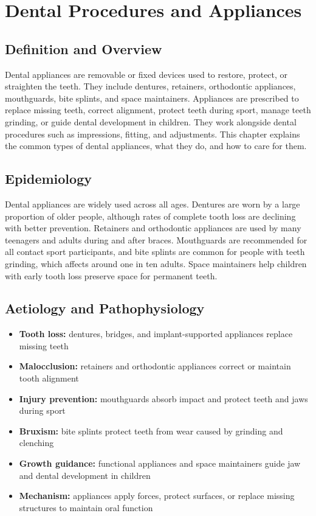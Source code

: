 \chapter{Dental Procedures and Appliances}

\section*{Definition and Overview}
Dental appliances are removable or fixed devices used to restore, protect, or straighten the teeth. They include dentures, retainers, orthodontic appliances, mouthguards, bite splints, and space maintainers. Appliances are prescribed to replace missing teeth, correct alignment, protect teeth during sport, manage teeth grinding, or guide dental development in children. They work alongside dental procedures such as impressions, fitting, and adjustments. This chapter explains the common types of dental appliances, what they do, and how to care for them.

\section*{Epidemiology}
Dental appliances are widely used across all ages. Dentures are worn by a large proportion of older people, although rates of complete tooth loss are declining with better prevention. Retainers and orthodontic appliances are used by many teenagers and adults during and after braces. Mouthguards are recommended for all contact sport participants, and bite splints are common for people with teeth grinding, which affects around one in ten adults. Space maintainers help children with early tooth loss preserve space for permanent teeth.

\section*{Aetiology and Pathophysiology}
\begin{itemize}
    \item \textbf{Tooth loss:} dentures, bridges, and implant-supported appliances replace missing teeth
    \item \textbf{Malocclusion:} retainers and orthodontic appliances correct or maintain tooth alignment
    \item \textbf{Injury prevention:} mouthguards absorb impact and protect teeth and jaws during sport
    \item \textbf{Bruxism:} bite splints protect teeth from wear caused by grinding and clenching
    \item \textbf{Growth guidance:} functional appliances and space maintainers guide jaw and dental development in children
    \item \textbf{Mechanism:} appliances apply forces, protect surfaces, or replace missing structures to maintain oral function
\end{itemize}

